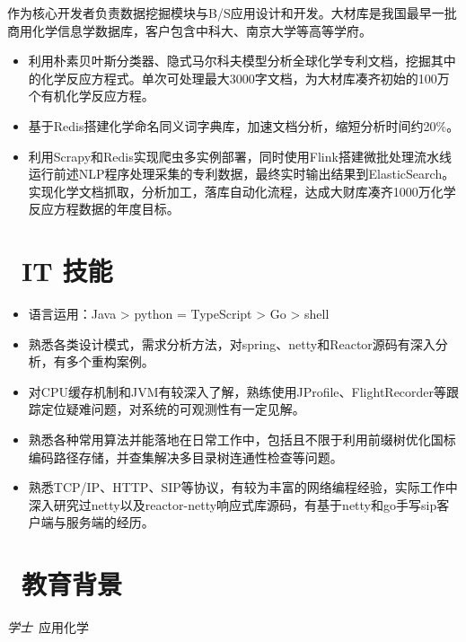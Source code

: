 \documentclass{resume}
\begin{document}
\begin{onehalfspacing}
作为核心开发者负责数据挖掘模块与B/S应用设计和开发。大材库是我国最早一批商用化学信息学数据库，客户包含中科大、南京大学等高等学府。
\begin{itemize}
  \item 利用朴素贝叶斯分类器、隐式马尔科夫模型分析全球化学专利文档，挖掘其中的化学反应方程式。单次可处理最大3000字文档，为大材库凑齐初始的100万个有机化学反应方程。
  \item 基于Redis搭建化学命名同义词字典库，加速文档分析，缩短分析时间约20\%。
  \item 利用Scrapy和Redis实现爬虫多实例部署，同时使用Flink搭建微批处理流水线运行前述NLP程序处理采集的专利数据，最终实时输出结果到ElasticSearch。实现化学文档抓取，分析加工，落库自动化流程，达成大财库凑齐1000万化学反应方程数据的年度目标。
\end{itemize}
\end{onehalfspacing}

\section{\faCogs\ IT 技能}
\begin{itemize}[parsep=0.5ex]
  \item 语言运用：Java > python = TypeScript > Go > shell
  \item 熟悉各类设计模式，需求分析方法，对spring、netty和Reactor源码有深入分析，有多个重构案例。
  \item 对CPU缓存机制和JVM有较深入了解，熟练使用JProfile、FlightRecorder等跟踪定位疑难问题，对系统的可观测性有一定见解。
  \item 熟悉各种常用算法并能落地在日常工作中，包括且不限于利用前缀树优化国标编码路径存储，并查集解决多目录树连通性检查等问题。
  \item 熟悉TCP/IP、HTTP、SIP等协议，有较为丰富的网络编程经验，实际工作中深入研究过netty以及reactor-netty响应式库源码，有基于netty和go手写sip客户端与服务端的经历。
\end{itemize}

\section{\faGraduationCap\  教育背景}
\textit{学士}\ 应用化学

\end{document}
